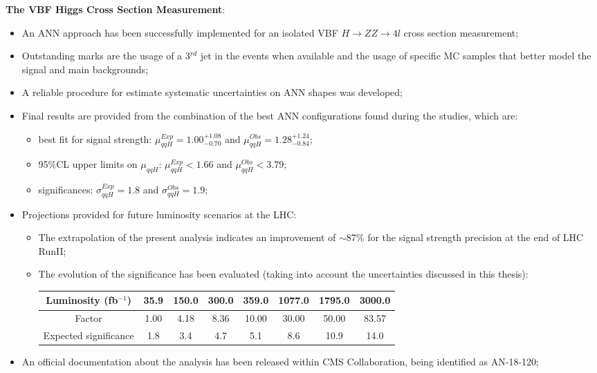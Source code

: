 {\flushleft \textbf{The VBF Higgs Cross Section Measurement}:}
\begin{itemize}
	\item An ANN approach has been successfully implemented for an isolated VBF $H \rightarrow ZZ \rightarrow 4l$ cross section measurement;
	\item Outstanding marks are the usage of a 3$^{rd}$ jet in the events when available and the usage of specific MC samples that better model the signal and main backgrounds;
	\item A reliable procedure for estimate systematic uncertainties on ANN shapes was developed;
	\item Final results are provided from the combination of the best ANN configurations found during the studies, which are:
	\begin{itemize}
		\item best fit for signal strength: $\mu_{qqH}^{Exp} = 1.00_{-0.70}^{+1.08}$ and $\mu_{qqH}^{Obs} = 1.28_{-0.84}^{+1.24}$;
		\item 95$\%$CL upper limits on $\mu_{qqH}$: $\mu_{qqH}^{Exp} < 1.66$ and $\mu_{qqH}^{Obs} < 3.79$;
		\item significances: $\sigma_{qqH}^{Exp} = 1.8$ and $\sigma_{qqH}^{Obs} = 1.9$;
		\end{itemize}
		\item Projections provided for future luminosity scenarios at the LHC:
	\begin{itemize}
		\item The extrapolation of the present analysis indicates an improvement of $\sim$87$\%$ for the signal strength precision at the end of LHC RunII;
		\item The evolution of the significance has been evaluated (taking into account the uncertainties discussed in this thesis):\\
		\begin{tabular}{c|c|c|c|c|c|c|c}
			\hline
			\rowcolor{light_gray}
			Luminosity (fb$^{-1}$) & 35.9 & 150.0 & 300.0 & 359.0 & 1077.0 & 1795.0 & 3000.0\\
			\hline
			Factor                 & 1.00 & 4.18  & 8.36  & 10.00 & 30.00  & 50.00  & 83.57\\
			\hline
			Expected significance  & 1.8  & 3.4   & 4.7   & 5.1   & 8.6    & 10.9   & 14.0\\
			\hline
		\end{tabular}
	\end{itemize}
	\item An official documentation about the analysis has been released within CMS Collaboration, being identified as AN-18-120;

\end{itemize}
